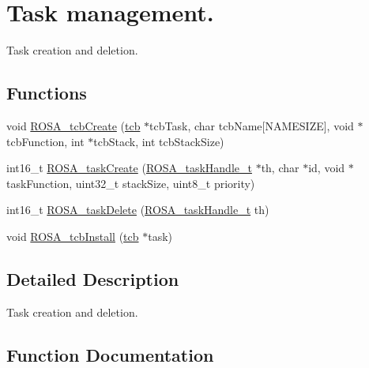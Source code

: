 \hypertarget{group__rosa__kernel__tm}{}\section{Task management.}
\label{group__rosa__kernel__tm}


Task creation and deletion.  


\subsection*{Functions}
\begin{DoxyCompactItemize}
\item 
void \hyperlink{group__rosa__kernel__tm_ga88a553c195e2f549835cbbf4e36a71ff}{R\+O\+S\+A\+\_\+tcb\+Create} (\hyperlink{structtcb__record__t}{tcb} $\ast$tcb\+Task, char tcb\+Name\mbox{[}N\+A\+M\+E\+S\+I\+Z\+E\mbox{]}, void $\ast$tcb\+Function, int $\ast$tcb\+Stack, int tcb\+Stack\+Size)
\item 
int16\+\_\+t \hyperlink{group__rosa__kernel__tm_gafb988fc32f38f2e72f01211772620b89}{R\+O\+S\+A\+\_\+task\+Create} (\hyperlink{rosa__def_8h_a99fb8cee8eedbe888bf5763d30c1d5c8}{R\+O\+S\+A\+\_\+task\+Handle\+\_\+t} $\ast$th, char $\ast$id, void $\ast$task\+Function, uint32\+\_\+t stack\+Size, uint8\+\_\+t priority)
\item 
int16\+\_\+t \hyperlink{group__rosa__kernel__tm_gae94345f223f72b5c735ae21fff3eec25}{R\+O\+S\+A\+\_\+task\+Delete} (\hyperlink{rosa__def_8h_a99fb8cee8eedbe888bf5763d30c1d5c8}{R\+O\+S\+A\+\_\+task\+Handle\+\_\+t} th)
\item 
void \hyperlink{group__rosa__kernel__tm_ga9a7bde19bc8609de66353d1f51d09eda}{R\+O\+S\+A\+\_\+tcb\+Install} (\hyperlink{structtcb__record__t}{tcb} $\ast$task)
\end{DoxyCompactItemize}


\subsection{Detailed Description}
Task creation and deletion. 



\subsection{Function Documentation}
\hypertarget{group__rosa__kernel__tm_gafb988fc32f38f2e72f01211772620b89}{}
